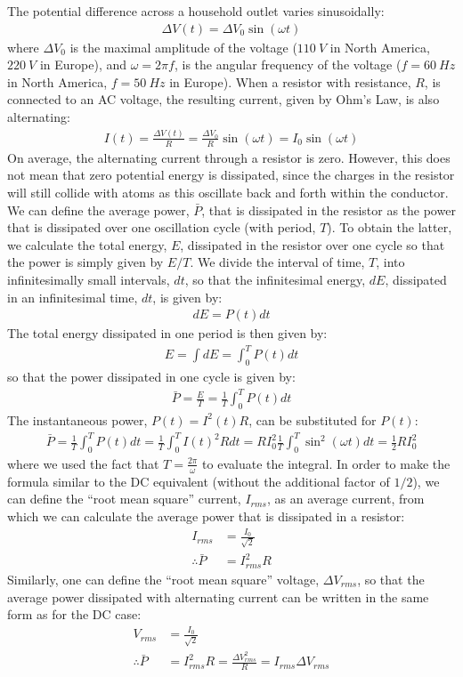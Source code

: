 The potential difference across a household outlet varies sinusoidally:
\begin{align*}
\Delta V (t) = \Delta V_0 \sin(\omega t)
\end{align*}
where $\Delta V_0$ is the maximal amplitude of the voltage ($\SI{110}{V}$ in North America, $\SI{220}{V}$ in Europe), and $\omega = 2\pi f$, is the angular frequency of the voltage ($f=\SI{60}{Hz}$ in North America, $f=\SI{50}{Hz}$ in Europe). When a resistor with resistance, $R$, is connected to an AC voltage, the resulting current, given by Ohm's Law, is also alternating:
\begin{align*}
I(t)=\frac{\Delta V(t)}{R}=\frac{\Delta V_0}{R}\sin(\omega t)=I_0\sin(\omega t)
\end{align*}
On average, the alternating current through a resistor is zero. However, this does not mean that zero potential energy is dissipated, since the charges in the resistor will still collide with atoms as this oscillate back and forth within the conductor. We can define the average power, $\bar P$, that is dissipated in the resistor as the  power that is dissipated over one oscillation cycle (with period, $T$). To obtain the latter, we calculate the total energy, $E$, dissipated in the resistor over one cycle so that the power is simply given by $E/T$. We divide the interval of time, $T$, into infinitesimally small intervals, $dt$, so that the infinitesimal energy, $dE$, dissipated in an infinitesimal time, $dt$, is given by:
\begin{align*}
dE=P(t) dt
\end{align*}
The total energy dissipated in one period is then given by:
\begin{align*}
E=\int dE = \int_0^T P(t)dt
\end{align*}
so that the power dissipated in one cycle is given by:
\begin{align*}
\bar P=\frac{E}{T}=\frac{1}{T}\int_0^T P(t)dt
\end{align*}
The instantaneous power, $P(t)=I^2(t)R$, can be substituted for $P(t)$:
\begin{align*}
\bar P = \frac{1}{T}\int_0^TP(t)dt=\frac{1}{T}\int_0^TI(t)^2Rdt=RI_0^2\frac{1}{T}\int_0^T\sin^2(\omega t)dt=\frac{1}{2}RI_0^2
\end{align*}
where we used the fact that $T=\frac{2\pi}{\omega}$ to evaluate the integral. In order to make the formula similar to the DC equivalent (without the additional factor of $1/2$), we can define the ``root mean square'' current, $I_{rms}$, as an average current, from which we can calculate the average power that is dissipated in a resistor:
\begin{align*}
I_{rms}&=\frac{I_0}{\sqrt 2}\\
\therefore\bar P&=I_{rms}^2R
\end{align*}
Similarly, one can define the ``root mean square'' voltage, $\Delta V_{rms}$, so that the average power dissipated with alternating current can be written in the same form as for the DC case:
\begin{align*}
V_{rms}&=\frac{I_0}{\sqrt 2}\\
\therefore\bar P&=I_{rms}^2R =\frac{\Delta V_{rms}^2}{R}=I_{rms}\Delta V_{rms}
\end{align*}

